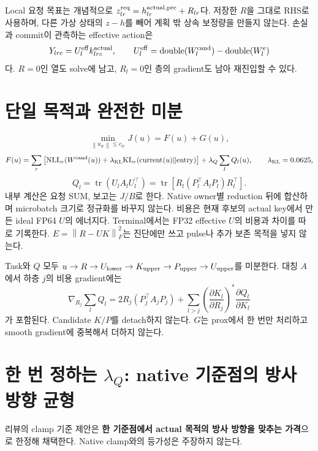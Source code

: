 \documentclass[11pt]{article}
\newcommand{\norm}[1]{\left\lVert #1\right\rVert}
\begin{document}
Local 요청 목표는 개념적으로
$z_{lr}^{\rm req}=h_{lr}^{\rm actual,pre}+R_{lr}$다.
저장한 $R$을 그대로 RHS로 사용하며, 다른 가상 상태의 $z-h$를 빼어
계획 밖 상속 보정량을 만들지 않는다.
손실과 commit이 관측하는 effective action은
\[
 Y_{lrc}=U_l^{\rm eff}k_{lrc}^{\rm actual},\qquad
 U_l^{\rm eff}=\operatorname{double}(W_l^{\rm cand})
             -\operatorname{double}(W_l^e)
\]
다. $R=0$인 열도 solve에 남고, $R_l=0$인 층의 gradient도 남아 재진입할 수 있다.

\section{단일 목적과 완전한 미분}
\[
 \min_{\norm{u_{lr}}\le c_{lr}} J(u)=F(u)+G(u),
\]
\[
 F(u)=\sum_r\left[\mathrm{NLL}_r(W^{\rm cand}(u))
 +\lambda_{\rm KL}\mathrm{KL}_r(\mathrm{current}(u)\Vert\mathrm{entry})\right]
 +\lambda_Q\sum_lQ_l(u),\qquad \lambda_{\rm KL}=0.0625 ,
\]
\[
 Q_l=\operatorname{tr}(U_lA_lU_l^\top)
 =\operatorname{tr}\!\left[R_l(P_l^\top A_lP_l)R_l^\top\right].
\]
내부 계산은 요청 SUM, 보고는 $J/B$로 한다.
Native owner별 reduction 뒤에 합산하며 microbatch 크기로 정규화를 바꾸지 않는다.
비용은 현재 후보의 actual key에서 만든 ideal FP64 $U$의 에너지다.
Terminal에서는 FP32 effective $U$의 비용과 차이를 따로 기록한다.
$E=\norm{R-UK}_F^2$는 진단에만 쓰고 pulse나 추가 보존 목적을 넣지 않는다.

Task와 $Q$ 모두
$u\to R\to U_{\rm lower}\to K_{\rm upper}\to P_{\rm upper}
\to U_{\rm upper}$를 미분한다.
대칭 $A$에서 하층 $j$의 비용 gradient에는
\[
 \nabla_{R_j}\sum_l Q_l
 =2R_j(P_j^\top A_jP_j)
 +\sum_{l>j}\left(\frac{\partial K_l}{\partial R_j}\right)^*
                 \frac{\partial Q_l}{\partial K_l}
\]
가 포함된다. Candidate $K/P$를 detach하지 않는다.
$G$는 prox에서 한 번만 처리하고 smooth gradient에 중복해서 더하지 않는다.

\section{한 번 정하는 $\lambda_Q$: native 기준점의 방사 방향 균형}
리뷰의 clamp 기준 제안은 \textbf{한 기준점에서 actual 목적의 방사 방향을
맞추는 가격}으로 한정해 채택한다. Native clamp와의 등가성은 주장하지 않는다.
\end{document}
